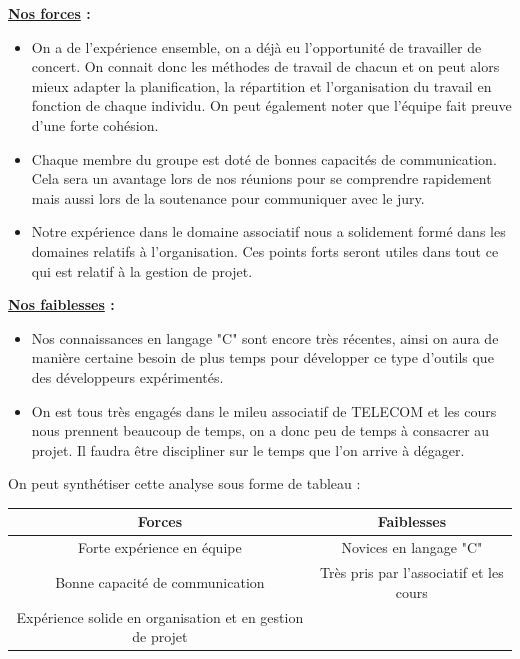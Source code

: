 \documentclass[a4paper, 12pt]{report}
\begin{document}
\textbf{\underline{Nos forces} :}
\begin{itemize}
    \item On a de l’expérience ensemble, on a déjà eu l'opportunité de travailler de concert. On connait donc les méthodes de travail de chacun et on peut alors mieux adapter la planification, la répartition et l'organisation du travail en fonction de chaque individu. On peut également noter que l'équipe fait preuve d'une forte cohésion.
    \item Chaque membre du groupe est doté de bonnes capacités de communication. Cela sera un avantage lors de nos réunions pour se comprendre rapidement mais aussi lors de la soutenance pour  communiquer avec le jury.
    \item Notre expérience dans le domaine associatif nous a solidement formé dans les domaines relatifs à l'organisation. Ces points forts seront utiles dans tout ce qui est relatif à la gestion de projet.
\end{itemize}
\bigskip

\textbf{\underline{Nos faiblesses} :}
\begin{itemize}
    \item Nos connaissances en langage "C" sont encore très récentes, ainsi on aura de manière certaine besoin de plus temps pour développer ce type d'outils que des développeurs expérimentés.
    \item On est tous très engagés dans le mileu associatif de TELECOM et les cours nous prennent beaucoup de temps, on a donc peu de temps à consacrer au projet.  Il faudra être discipliner sur le temps que l'on arrive à dégager.
\end{itemize}
\clearpage

On peut synthétiser cette analyse sous forme de tableau :

\begin{table}[htbp]
    \centering\begin{tabular}{|c|c|}
        \hline
        \textcolor{mainColor}{Forces}                             & \textcolor{mainColor}{Faiblesses}       \\
        \hline\hline
        Forte expérience en équipe                                & Novices en langage "C"                  \\
        \hline
        Bonne capacité de communication                           & Très pris par l'associatif et les cours \\
        \hline
        Expérience solide en organisation et en gestion de projet &                                         \\
        \hline
    \end{tabular}
\end{table}
\end{document}
